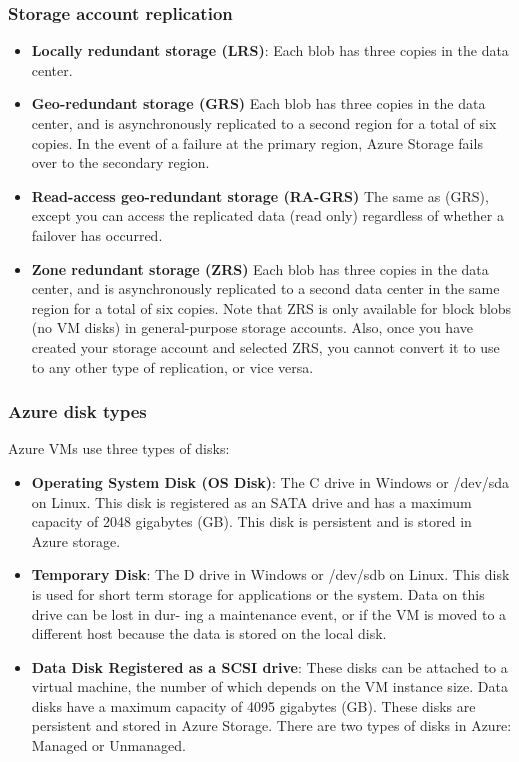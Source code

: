 \documentclass[12pt]{article}
\begin{document}
\subsubsection{Storage account replication}
\begin{itemize}
    \item \textbf{Locally redundant storage (LRS)}: Each blob has three copies in the data center.
    \item \textbf{Geo-redundant storage (GRS)} Each blob has three copies in the data center, and is asynchronously replicated to a second region for a total of six copies. In the event of a failure at the primary region, Azure Storage fails over to the secondary region.
    \item \textbf{Read-access geo-redundant storage (RA-GRS)} The same as (GRS), except you can access the replicated data (read only) regardless of whether a failover has occurred.
    \item \textbf{Zone redundant storage (ZRS)} Each blob has three copies in the data center, and is asynchronously replicated to a second data center in the same region for a total of six copies. Note that ZRS is only available for block blobs (no VM disks) in general-purpose storage accounts. Also, once you have created your storage account and selected ZRS, you cannot convert it to use to any other type of replication, or vice versa.
\end{itemize}

\subsubsection{Azure disk types}
Azure VMs use three types of disks:
\begin{itemize}
    
    \item \textbf{Operating System Disk (OS Disk)}: The C drive in Windows or /dev/sda on Linux. This disk is registered as an SATA drive and has a maximum capacity of 2048 gigabytes (GB). This disk is persistent and is stored in Azure storage.
    \item \textbf{Temporary Disk}: The D drive in Windows or /dev/sdb on Linux. This disk is used for short term storage for applications or the system. Data on this drive can be lost in dur- ing a maintenance event, or if the VM is moved to a different host because the data is stored on the local disk.
    \item \textbf{Data Disk Registered as a SCSI drive}: These disks can be attached to a virtual machine, the number of which depends on the VM instance size. Data disks have a maximum capacity of 4095 gigabytes (GB). These disks are persistent and stored in Azure Storage.
There are two types of disks in Azure: Managed or Unmanaged.
\end{itemize}
\end{document}
